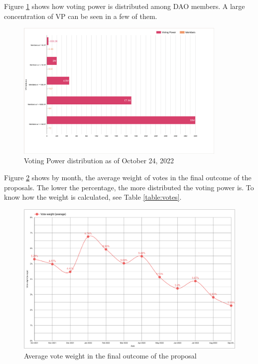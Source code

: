 \documentclass[MSE,Master,english]{twbook}%
\begin{document}
Figure \ref{fig:vp_distribution_members} shows how voting power is distributed among \gls{DAO} members. A large concentration of VP can be seen in a few of them.
\begin{figure}[H]
  \centering
  \includegraphics[width=0.9\textwidth]{metrics/vp_distribution_members.png}
  \caption{Voting Power distribution as of October 24, 2022}
  \label{fig:vp_distribution_members}
\end{figure}

Figure \ref{fig:vote_weight} shows by month, the average weight of votes in the final outcome of the proposals. The lower the percentage, the more distributed the voting power is. To know how the weight is calculated, see Table \ref{table:votes}.
\begin{figure}[H]
  \centering
  \includegraphics[width=\textwidth]{metrics/vote_weight.png}
  \caption{Average vote weight in the final outcome of the proposal}
  \label{fig:vote_weight}
\end{figure}
\end{document}

